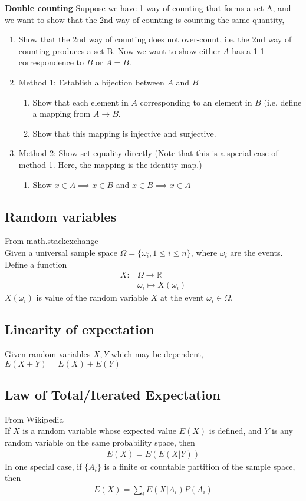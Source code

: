 \documentclass{article}
\begin{document}
\textbf{Double counting}
Suppose we have 1 way of counting that forms a set A, and we want to show that the 2nd way of counting is counting the same quantity, 
\begin{enumerate} 
    \item Show that the 2nd way of counting does not over-count, i.e. the 2nd way of counting produces a set B. Now we want to show either $A$ has a 1-1 correspondence to $B$ or $A=B$.
    \item Method 1: Establish a bijection between $A$ and $B$
    \begin{enumerate}
        \item Show that each element in $A$ corresponding to an element in $B$ (i.e. define a mapping from $A\rightarrow B$.
        \item Show that this mapping is injective and surjective.
    \end{enumerate}
    \item Method 2: Show set equality directly (Note that this is a special case of method 1. Here, the mapping is the identity map.)
    \begin{enumerate}
        \item Show $x\in A\implies x\in B$ and $x\in B\implies x\in A$
    \end{enumerate}
\end{enumerate}

\subsection{Random variables}
From math.stackexchange\\
Given a universal sample space $\Omega=\{\omega_i, 1\leq i\leq n\}$, where $\omega_i$ are the events.\\
Define a function
\begin{align*}
	X: &\Omega \rightarrow \mathbb{R}\\
	&\omega_i \mapsto X(\omega_i)
\end{align*}
$X(\omega_i)$ is value of the random variable $X$ at the event $\omega_i \in \Omega$.
\subsection{Linearity of expectation}
Given random variables $X,Y$ which may be dependent, $E(X+Y)=E(X)+E(Y)$

\subsection{Law of Total/Iterated Expectation}
From Wikipedia\\
If $X$ is a random variable whose expected value $E(X)$ is defined, and $Y$ is any random variable on the same probability space, then 
\begin{align*}
	E(X)=E(E(X|Y))
\end{align*}
In one special case, if $\{A_i\}$ is a finite or countable partition of the sample space, then 
\begin{align*}
	E(X)=\sum_iE(X|A_i)P(A_i)
\end{align*}
\end{document}

